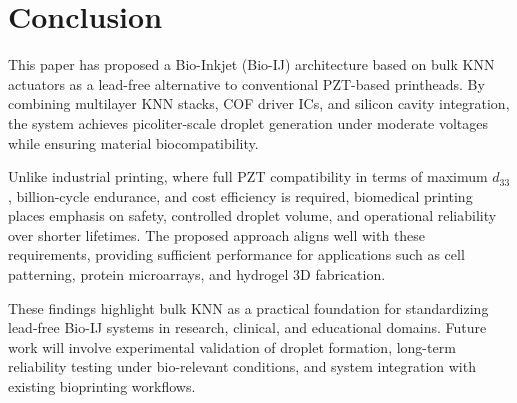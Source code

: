 \section{Conclusion}
This paper has proposed a Bio-Inkjet (Bio-IJ) architecture based on
bulk KNN actuators as a lead-free alternative to conventional PZT-based
printheads.
By combining multilayer KNN stacks, COF driver ICs, and silicon cavity
integration, the system achieves picoliter-scale droplet generation
under moderate voltages while ensuring material biocompatibility.

Unlike industrial printing, where full PZT compatibility in terms of
maximum $d_{33}$, billion-cycle endurance, and cost efficiency is
required, biomedical printing places emphasis on safety, controlled
droplet volume, and operational reliability over shorter lifetimes.
The proposed approach aligns well with these requirements, providing
sufficient performance for applications such as cell patterning,
protein microarrays, and hydrogel 3D fabrication.

These findings highlight bulk KNN as a practical foundation for
standardizing lead-free Bio-IJ systems in research, clinical, and
educational domains.
Future work will involve experimental validation of droplet formation,
long-term reliability testing under bio-relevant conditions, and system
integration with existing bioprinting workflows.
